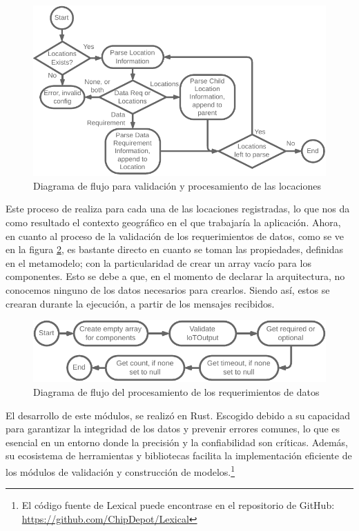 \begin{figure}[ht]
    \centering
    \caption{Diagrama de flujo para validación y procesamiento de las locaciones}
    \label{fig:LexicalLocations}
    \includegraphics[width=\linewidth]{images/LexicalLocationsFlow.pdf}
\end{figure}


Este proceso de realiza para cada una de las locaciones registradas, lo que nos da como resultado el contexto geográfico en el que trabajaría la aplicación. Ahora, en cuanto al proceso de la validación de los requerimientos de datos, como se ve en la figura \ref{fig:LexicalDataReq}, es bastante directo en cuanto se toman las propiedades, definidas en el metamodelo; con la particularidad de crear un array vacío para los componentes. Esto se debe a que, en el momento de declarar la arquitectura, no conocemos ninguno de los datos necesarios para crearlos. Siendo así, estos se crearan durante la ejecución, a partir de los mensajes recibidos.

\begin{figure}[ht]
    \centering
    \caption{Diagrama de flujo del procesamiento de los requerimientos de datos}
    \label{fig:LexicalDataReq}
    \includegraphics[width=0.9\linewidth]{images/LexicalDataRqeFlow.pdf}
\end{figure}

El desarrollo de este módulos, se realizó en Rust. Escogido debido a su capacidad para garantizar la integridad de los datos y prevenir errores comunes, lo que es esencial en un entorno donde la precisión y la confiabilidad son críticas. Además, su ecosistema de herramientas y bibliotecas facilita la implementación eficiente de los módulos de validación y construcción de modelos.\footnote{El código fuente de Lexical puede encontrase en el repositorio de GitHub: \url{https://github.com/ChipDepot/Lexical}}

